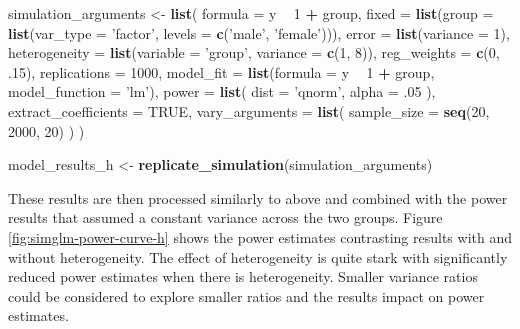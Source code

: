 \documentclass[man,mask,floatsintext]{apa6}
\newenvironment{Shaded}{\begin{snugshade}}{\end{snugshade}}
\newcommand{\DataTypeTok}[1]{\textcolor[rgb]{0.13,0.29,0.53}{#1}}
\newcommand{\DecValTok}[1]{\textcolor[rgb]{0.00,0.00,0.81}{#1}}
\newcommand{\FloatTok}[1]{\textcolor[rgb]{0.00,0.00,0.81}{#1}}
\newcommand{\KeywordTok}[1]{\textcolor[rgb]{0.13,0.29,0.53}{\textbf{#1}}}
\newcommand{\NormalTok}[1]{#1}
\newcommand{\OperatorTok}[1]{\textcolor[rgb]{0.81,0.36,0.00}{\textbf{#1}}}
\newcommand{\OtherTok}[1]{\textcolor[rgb]{0.56,0.35,0.01}{#1}}
\newcommand{\StringTok}[1]{\textcolor[rgb]{0.31,0.60,0.02}{#1}}
\begin{document}
\begin{Shaded}
\begin{Highlighting}[]
\NormalTok{simulation_arguments <-}\StringTok{ }\KeywordTok{list}\NormalTok{(}
  \DataTypeTok{formula =}\NormalTok{ y }\OperatorTok{~}\StringTok{ }\DecValTok{1} \OperatorTok{+}\StringTok{ }\NormalTok{group,}
  \DataTypeTok{fixed =} \KeywordTok{list}\NormalTok{(}\DataTypeTok{group =} \KeywordTok{list}\NormalTok{(}\DataTypeTok{var_type =} \StringTok{'factor'}\NormalTok{, }
                            \DataTypeTok{levels =} \KeywordTok{c}\NormalTok{(}\StringTok{'male'}\NormalTok{, }\StringTok{'female'}\NormalTok{))),}
  \DataTypeTok{error =} \KeywordTok{list}\NormalTok{(}\DataTypeTok{variance =} \DecValTok{1}\NormalTok{),}
  \DataTypeTok{heterogeneity =} \KeywordTok{list}\NormalTok{(}\DataTypeTok{variable =} \StringTok{'group'}\NormalTok{,}
                       \DataTypeTok{variance =} \KeywordTok{c}\NormalTok{(}\DecValTok{1}\NormalTok{, }\DecValTok{8}\NormalTok{)),}
  \DataTypeTok{reg_weights =} \KeywordTok{c}\NormalTok{(}\DecValTok{0}\NormalTok{, }\FloatTok{.15}\NormalTok{),}
  \DataTypeTok{replications =} \DecValTok{1000}\NormalTok{,}
  \DataTypeTok{model_fit =} \KeywordTok{list}\NormalTok{(}\DataTypeTok{formula =}\NormalTok{ y }\OperatorTok{~}\StringTok{ }\DecValTok{1} \OperatorTok{+}\StringTok{ }\NormalTok{group, }
                   \DataTypeTok{model_function =} \StringTok{'lm'}\NormalTok{),}
  \DataTypeTok{power =} \KeywordTok{list}\NormalTok{(}
    \DataTypeTok{dist =} \StringTok{'qnorm'}\NormalTok{,}
    \DataTypeTok{alpha =} \FloatTok{.05}
\NormalTok{  ),}
  \DataTypeTok{extract_coefficients =} \OtherTok{TRUE}\NormalTok{,}
  \DataTypeTok{vary_arguments =} \KeywordTok{list}\NormalTok{(}
    \DataTypeTok{sample_size =} \KeywordTok{seq}\NormalTok{(}\DecValTok{20}\NormalTok{, }\DecValTok{2000}\NormalTok{, }\DecValTok{20}\NormalTok{) }
\NormalTok{  )}
\NormalTok{)}

\NormalTok{model_results_h <-}\StringTok{ }\KeywordTok{replicate_simulation}\NormalTok{(simulation_arguments)}
\end{Highlighting}
\end{Shaded}

These results are then processed similarly to above and combined with the power results that assumed a constant variance across the two groups. Figure \ref{fig:simglm-power-curve-h} shows the power estimates contrasting results with and without heterogeneity. The effect of heterogeneity is quite stark with significantly reduced power estimates when there is heterogeneity. Smaller variance ratios could be considered to explore smaller ratios and the results impact on power estimates.
\end{document}
